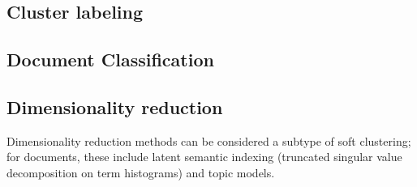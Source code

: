 \documentclass{VUMIFInfKursinis}
\begin{document}
\subsection{Cluster labeling}
\subsection{Document Classification}
\subsection{Dimensionality reduction}
Dimensionality reduction methods can be considered a subtype of soft clustering; for documents, these include latent semantic indexing (truncated singular value decomposition on term histograms) and topic models.

\printbibliography[heading=bibintoc] %

\appendix  %
\end{document}
